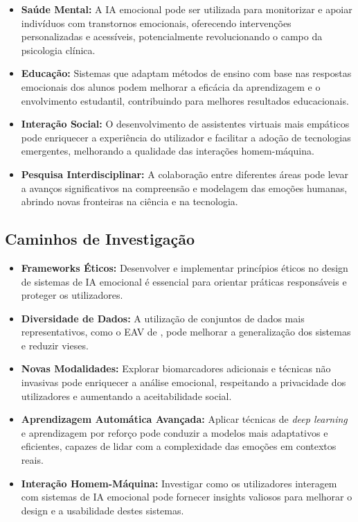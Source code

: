 \documentclass[a4paper,12pt]{report}
\begin{document}
	\begin{itemize} \item \textbf{Saúde Mental:} A IA emocional pode ser utilizada para monitorizar e apoiar indivíduos com transtornos emocionais, oferecendo intervenções personalizadas e acessíveis, potencialmente revolucionando o campo da psicologia clínica. \item \textbf{Educação:} Sistemas que adaptam métodos de ensino com base nas respostas emocionais dos alunos podem melhorar a eficácia da aprendizagem e o envolvimento estudantil, contribuindo para melhores resultados educacionais. \item \textbf{Interação Social:} O desenvolvimento de assistentes virtuais mais empáticos pode enriquecer a experiência do utilizador e facilitar a adoção de tecnologias emergentes, melhorando a qualidade das interações homem-máquina. \item \textbf{Pesquisa Interdisciplinar:} A colaboração entre diferentes áreas pode levar a avanços significativos na compreensão e modelagem das emoções humanas, abrindo novas fronteiras na ciência e na tecnologia. \end{itemize}
	
	\subsection{Caminhos de Investigação}
	
	\begin{itemize} \item \textbf{Frameworks Éticos:} Desenvolver e implementar princípios éticos no design de sistemas de IA emocional é essencial para orientar práticas responsáveis e proteger os utilizadores. \item \textbf{Diversidade de Dados:} A utilização de conjuntos de dados mais representativos, como o EAV de \textcite{lee2024}, pode melhorar a generalização dos sistemas e reduzir vieses. \item \textbf{Novas Modalidades:} Explorar biomarcadores adicionais e técnicas não invasivas pode enriquecer a análise emocional, respeitando a privacidade dos utilizadores e aumentando a aceitabilidade social. \item \textbf{Aprendizagem Automática Avançada:} Aplicar técnicas de \textit{deep learning} e aprendizagem por reforço pode conduzir a modelos mais adaptativos e eficientes, capazes de lidar com a complexidade das emoções em contextos reais. \item \textbf{Interação Homem-Máquina:} Investigar como os utilizadores interagem com sistemas de IA emocional pode fornecer insights valiosos para melhorar o design e a usabilidade destes sistemas. \end{itemize}
	
\end{document}
